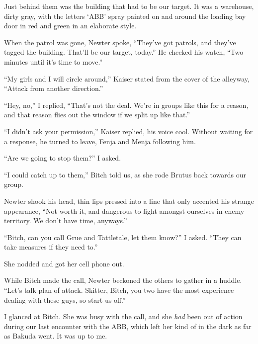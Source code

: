 Just behind them was the building that had to be our target.  It was a warehouse, dirty gray, with the letters `ABB' spray painted on and around the loading bay door in red and green in an elaborate style.



When the patrol was gone, Newter spoke, ``They've got patrols, and they've tagged the building.  That'll be our target, today.''  He checked his watch, ``Two minutes until it's time to move.''



``My girls and I will circle around,'' Kaiser stated from the cover of the alleyway, ``Attack from another direction.''



``Hey, no,'' I replied, ``That's not the deal.  We're in groups like this for a reason, and that reason flies out the window if we split up like that.''



``I didn't ask your permission,'' Kaiser replied, his voice cool.  Without waiting for a response, he turned to leave, Fenja and Menja following him.



``Are we going to stop them?'' I asked.



``I could catch up to them,'' Bitch told us, as she rode Brutus back towards our group.



Newter shook his head, thin lips pressed into a line that only accented his strange appearance, ``Not worth it, and dangerous to fight amongst ourselves in enemy territory.  We don't have time, anyways.''



``Bitch, can you call Grue and Tattletale, let them know?'' I asked.  ``They can take measures if they need to.''



She nodded and got her cell phone out.



While Bitch made the call, Newter beckoned the others to gather in a huddle.  ``Let's talk plan of attack.  Skitter, Bitch, you two have the most experience dealing with these guys, so start us off.''



I glanced at Bitch.  She was busy with the call, and she \emph{had} been out of action during our last encounter with the ABB, which left her kind of in the dark as far as Bakuda went.  It was up to me.



